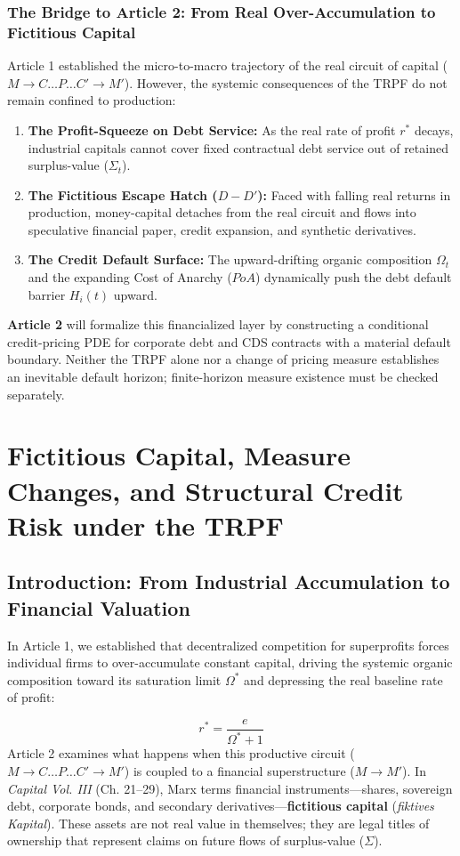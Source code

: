 \documentclass[11pt,letterpaper]{report}
\begin{document}
\subsection{The Bridge to Article 2: From Real Over-Accumulation to Fictitious Capital}
Article 1 established the micro-to-macro trajectory of the real circuit of capital ($M \to C \dots P \dots C' \to M'$). However, the systemic consequences of the TRPF do not remain confined to production:

\begin{enumerate}
\item \textbf{The Profit-Squeeze on Debt Service:} As the real rate of profit ${r}^{*}$ decays, industrial capitals cannot cover fixed contractual debt service out of retained surplus-value (${\Sigma }_{t}$).
\item \textbf{The Fictitious Escape Hatch ($D-D'$):} Faced with falling real returns in production, money-capital detaches from the real circuit and flows into speculative financial paper, credit expansion, and synthetic derivatives.
\item \textbf{The Credit Default Surface:} The upward-drifting organic composition ${\Omega }_{t}$ and the expanding Cost of Anarchy ($PoA$) dynamically push the debt default barrier ${H}_{i}(t)$ upward.
\end{enumerate}
\textbf{Article 2} will formalize this financialized layer by constructing a conditional credit-pricing PDE for corporate debt and CDS contracts with a material default boundary. Neither the TRPF alone nor a change of pricing measure establishes an inevitable default horizon; finite-horizon measure existence must be checked separately.

\chapter{Fictitious Capital, Measure Changes, and Structural Credit Risk under the TRPF}
\section{Introduction: From Industrial Accumulation to Financial Valuation}
In Article 1, we established that decentralized competition for superprofits forces individual firms to over-accumulate constant capital, driving the systemic organic composition toward its saturation limit ${\Omega }^{*}$ and depressing the real baseline rate of profit:

\[
{r}^{*}=\frac{e}{{\Omega }^{*}+1}
\]
Article 2 examines what happens when this productive circuit ($M \to C \dots P \dots C' \to M'$) is coupled to a financial superstructure ($M\rightarrow M'$). In \emph{Capital Vol. III} (Ch. 21--29), Marx terms financial instruments---shares, sovereign debt, corporate bonds, and secondary derivatives---\textbf{fictitious capital} (\emph{fiktives Kapital}). These assets are not real value in themselves; they are legal titles of ownership that represent claims on future flows of surplus-value ($\Sigma$).
\end{document}
